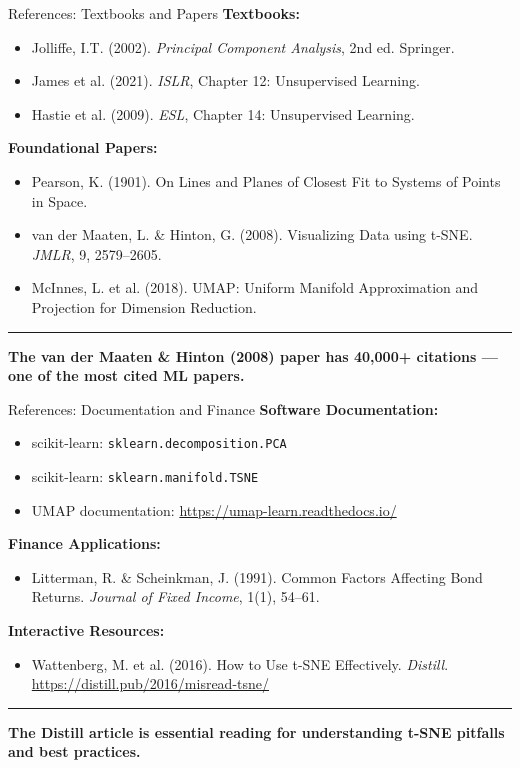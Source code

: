 \documentclass[8pt,aspectratio=169]{beamer}
\newcommand{\bottomnote}[1]{%
\vfill
\vspace{-2mm}
\textcolor{mllavender2}{\rule{\textwidth}{0.4pt}}
\vspace{1mm}
\footnotesize
\textbf{#1}
}
\begin{document}
\begin{frame}[t]{References: Textbooks and Papers}
\small
\textbf{Textbooks:}
\begin{itemize}
  \item Jolliffe, I.T. (2002). \textit{Principal Component Analysis}, 2nd ed. Springer.
  \item James et al. (2021). \textit{ISLR}, Chapter 12: Unsupervised Learning.
  \item Hastie et al. (2009). \textit{ESL}, Chapter 14: Unsupervised Learning.
\end{itemize}

\vspace{0.3em}
\textbf{Foundational Papers:}
\begin{itemize}
  \item Pearson, K. (1901). On Lines and Planes of Closest Fit to Systems of Points in Space.
  \item van der Maaten, L. \& Hinton, G. (2008). Visualizing Data using t-SNE. \textit{JMLR}, 9, 2579--2605.
  \item McInnes, L. et al. (2018). UMAP: Uniform Manifold Approximation and Projection for Dimension Reduction.
\end{itemize}
\bottomnote{The van der Maaten \& Hinton (2008) paper has 40,000+ citations --- one of the most cited ML papers.}
\end{frame}

\begin{frame}[t]{References: Documentation and Finance}
\small
\textbf{Software Documentation:}
\begin{itemize}
  \item scikit-learn: \texttt{sklearn.decomposition.PCA}
  \item scikit-learn: \texttt{sklearn.manifold.TSNE}
  \item UMAP documentation: \url{https://umap-learn.readthedocs.io/}
\end{itemize}

\vspace{0.3em}
\textbf{Finance Applications:}
\begin{itemize}
  \item Litterman, R. \& Scheinkman, J. (1991). Common Factors Affecting Bond Returns. \textit{Journal of Fixed Income}, 1(1), 54--61.
\end{itemize}

\vspace{0.3em}
\textbf{Interactive Resources:}
\begin{itemize}
  \item Wattenberg, M. et al. (2016). How to Use t-SNE Effectively. \textit{Distill}. \url{https://distill.pub/2016/misread-tsne/}
\end{itemize}
\bottomnote{The Distill article is essential reading for understanding t-SNE pitfalls and best practices.}
\end{frame}
\end{document}
